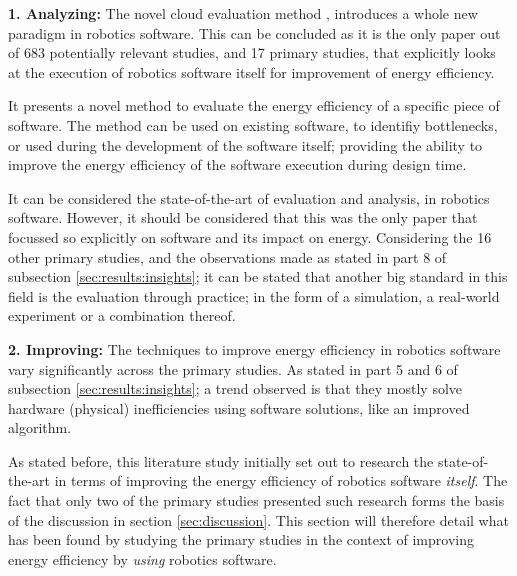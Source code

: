 \vspace{5mm}

\noindent\textbf{1. Analyzing:}
The novel cloud evaluation method \cite{hou2017novel_cloud_evaluation_model}, introduces a whole new paradigm in robotics software.
This can be concluded as it is the only paper out of 683 potentially relevant studies, and 17 primary studies, 
that explicitly looks at the execution of robotics software itself for improvement of energy efficiency.

It presents a novel method to evaluate the energy efficiency of a specific piece of software.
The method can be used on existing software, to identifiy bottlenecks, or used during the development of the software itself;
providing the ability to improve the energy efficiency of the software execution during design time.

It can be considered the state-of-the-art of evaluation and analysis, in robotics software.
However, it should be considered that this was the only paper that focussed so explicitly on software and its impact on energy.
Considering the 16 other primary studies, and the observations made as stated in part 8 of subsection \ref{sec:results:insights}; 
it can be stated that another big standard in this field is the evaluation through practice; 
in the form of a simulation, a real-world experiment or a combination thereof.

\vspace{5mm}

\noindent\textbf{2. Improving:}
The techniques to improve energy efficiency in robotics software vary significantly across the primary studies. 
As stated in part 5 and 6 of subsection \ref{sec:results:insights}; a trend observed is that they mostly solve hardware (physical) 
inefficiencies using software solutions, like an improved algorithm.

\vspace{2mm}

As stated before, this literature study initially set out to research the state-of-the-art in terms of improving the
energy efficiency of robotics software \textit{itself}.
The fact that only two of the primary studies presented such research forms the basis of the discussion in section \ref{sec:discussion}. 
This section will therefore detail what has been found by studying the primary studies in the context of improving energy efficiency 
by \textit{using} robotics software.

\vspace{2mm}

